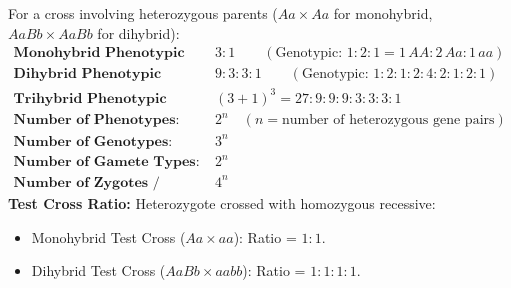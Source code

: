 \documentclass[10pt,a4paper]{article}
\begin{document}
\begin{formulabox}
For a cross involving heterozygous parents ($Aa \times Aa$ for monohybrid, $AaBb \times AaBb$ for dihybrid):
\begin{align*}
  \textbf{Monohybrid Phenotypic Ratio: } & 3 : 1 \qquad (\text{Genotypic: } 1 : 2 : 1 = 1\,AA : 2\,Aa : 1\,aa)\\
  \textbf{Dihybrid Phenotypic Ratio: } & 9 : 3 : 3 : 1 \qquad (\text{Genotypic: } 1:2:1:2:4:2:1:2:1)\\
  \textbf{Trihybrid Phenotypic Ratio: } & (3 + 1)^3 = 27 : 9 : 9 : 9 : 3 : 3 : 3 : 1\\
  \textbf{Number of Phenotypes: } & 2^n \quad (n = \text{number of heterozygous gene pairs})\\
  \textbf{Number of Genotypes: } & 3^n\\
  \textbf{Number of Gamete Types: } & 2^n\\
  \textbf{Number of Zygotes / Offspring: } & 4^n
\end{align*}
\textbf{Test Cross Ratio:} Heterozygote crossed with homozygous recessive:
\begin{itemize}
  \item Monohybrid Test Cross ($Aa \times aa$): Ratio = $1 : 1$.
  \item Dihybrid Test Cross ($AaBb \times aabb$): Ratio = $1 : 1 : 1 : 1$.
\end{itemize}
\end{formulabox}
\end{document}
